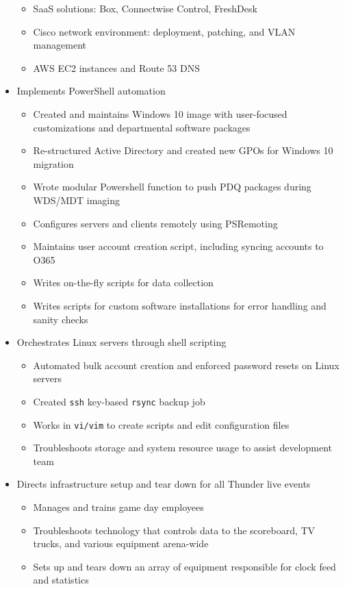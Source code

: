 \documentclass[line]{res}
\begin{document}
\begin{resume}
\begin{itemize}
\begin{itemize}
				\item SaaS solutions: Box, Connectwise Control, FreshDesk
				\item Cisco network environment: deployment, patching, and VLAN management		
				\item AWS EC2 instances and Route 53 DNS
			\end{itemize}
		\item Implements PowerShell automation
			\begin{itemize}
				\item Created and maintains Windows 10 image with user-focused customizations and departmental software packages
				\item Re-structured Active Directory and created new GPOs for Windows 10 migration
				\item Wrote modular Powershell function to push PDQ packages during WDS/MDT imaging
				\item Configures servers and clients remotely using PSRemoting
				\item Maintains user account creation script, including syncing accounts to O365
				\item Writes on-the-fly scripts for data collection
				\item Writes scripts for custom software installations for error handling and sanity checks
			\end{itemize}
		\item Orchestrates Linux servers through shell scripting
			\begin{itemize}
				\item Automated bulk account creation and enforced password resets on Linux servers
				\item Created \texttt{ssh} key-based \texttt{rsync} backup job
				\item Works in \texttt{vi/vim} to create scripts and edit configuration files
				\item Troubleshoots storage and system resource usage to assist development team
			\end{itemize}
		\item Directs infrastructure setup and tear down for all Thunder live events
			\begin{itemize}
				\item Manages and trains game day employees
				\item Troubleshoots technology that controls data to the scoreboard, TV trucks, and various equipment arena-wide
				\item Sets up and tears down an array of equipment responsible for clock feed and statistics

\end{itemize}
\end{itemize}
\end{resume}
\end{document}
